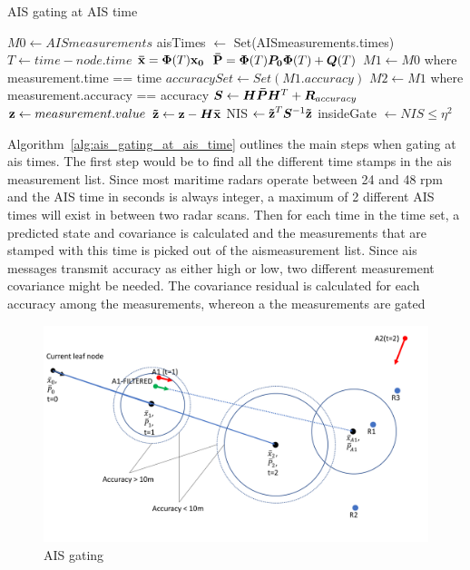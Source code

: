 \begin{algorithm}[H]
\caption{AIS gating at AIS time}\label{alg:ais_gating_at_ais_time}
\begin{algorithmic}[1]
\State{} \(M0 \gets AISmeasurements\)
\State{}  aisTimes \( \gets \) Set(AISmeasurements.times) 
\State{} \(T \gets time - node.time \)
\State{} \( \boldsymbol{\mathbf{\bar{x}}} = \bm{\Phi}(T) \boldsymbol{\mathbf{x_0}} \)
\State{} \( \boldsymbol{\mathbf{\bar{P}}} = \bm{\Phi}(T) \bm{P_0} \bm{\Phi}(T) + \bm{Q}(T) \)
\State{} \( M1 \gets M0\) where measurement.time  == time
\State{} \( accuracySet \gets Set(M1.accuracy)\) 
\State{} \(M2 \gets M1\) where measurement.accuracy == accuracy
\State{} \( \bm{S} \gets \bm{H}\bm{\bar{P}}\bm{H}^T + \bm{R}_{accuracy} \)
\State{} \( \boldsymbol{\mathbf{z}} \gets measurement.value \)
\State{} \( \boldsymbol{\mathbf{\tilde{z}}} \gets \boldsymbol{\mathbf{z}} - \bm{H} \boldsymbol{\mathbf{\bar{x}}} \)
\State{} NIS \( \gets \boldsymbol{\mathbf{\tilde{z}}}^T \bm{S}^{-1} \boldsymbol{\mathbf{\tilde{z}}} \)
\State{} insideGate \( \gets NIS \leq \eta^2 \)
\EndFor{}
\EndFor{}
\EndFor{}
\EndProcedure{}
\end{algorithmic}
\end{algorithm}
Algorithm~\ref{alg:ais_gating_at_ais_time} outlines the main steps when gating at \gls{ais} times. The first step would be to find all the different time stamps in the \gls{ais} \gls{measurement list}. Since most maritime radars operate between 24 and 48 \gls{rpm} and the AIS time in seconds is always integer, a maximum of 2 different AIS times will exist in between two radar scans. Then for each time in the time set, a predicted state and covariance is calculated and the measurements that are stamped with this time is picked out of the \gls{ais}measurement list. Since \gls{ais} messages transmit accuracy as either high or low, two different measurement covariance might be needed. The covariance residual is calculated for each accuracy among the measurements, whereon a the measurements are gated


\begin{figure}
\centering
\includegraphics[width = .8\textwidth]{Figures/AIS_gating.pdf}
\caption{AIS gating}\label{fig:ais_gating}
\end{figure}

